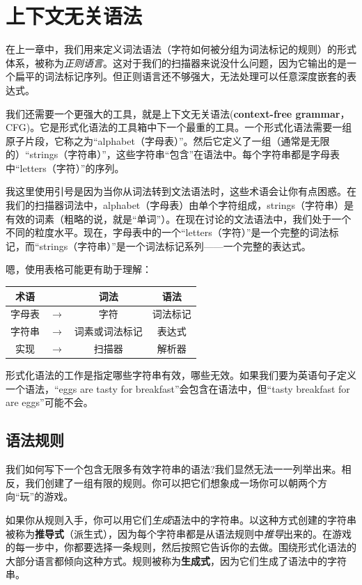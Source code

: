 \documentclass[cn,11pt,chinese]{elegantbook}
\begin{document}
\section{上下文无关语法}

在上一章中，我们用来定义词法语法（字符如何被分组为词法标记的规则）的形式体系，被称为\textit{正则语言}。这对于我们的扫描器来说没什么问题，因为它输出的是一个扁平的词法标记序列。但正则语言还不够强大，无法处理可以任意深度嵌套的表达式。

我们还需要一个更强大的工具，就是上下文无关语法(\textbf{context-free grammar}，CFG)。它是形式化语法的工具箱中下一个最重的工具。一个形式化语法需要一组原子片段，它称之为“alphabet（字母表）”。然后它定义了一组（通常是无限的）“strings（字符串）”，这些字符串“包含”在语法中。每个字符串都是字母表中“letters（字符）”的序列。

我这里使用引号是因为当你从词法转到文法语法时，这些术语会让你有点困惑。在我们的扫描器词法中，alphabet（字母表）由单个字符组成，strings（字符串）是有效的词素（粗略的说，就是“单词”）。在现在讨论的文法语法中，我们处于一个不同的粒度水平。现在，字母表中的一个“letters（字符）”是一个完整的词法标记，而“strings（字符串）”是一个词法标记系列——一个完整的表达式。

嗯，使用表格可能更有助于理解：

\begin{center}
  \begin{tabular}{ |c|c|c|c| } 
   \hline
   术语 &  & 词法 & 语法 \\
   \hline 
   字母表 & $\rightarrow$ & 字符 & 词法标记 \\ 
   字符串 & $\rightarrow$ & 词素或词法标记 & 表达式 \\
   实现 & $\rightarrow$ & 扫描器 & 解析器 \\ 
   \hline
  \end{tabular}
\end{center}

形式化语法的工作是指定哪些字符串有效，哪些无效。如果我们要为英语句子定义一个语法，“eggs are tasty for breakfast”会包含在语法中，但“tasty breakfast for are eggs”可能不会。

\subsection{语法规则}

我们如何写下一个包含无限多有效字符串的语法?我们显然无法一一列举出来。相反，我们创建了一组有限的规则。你可以把它们想象成一场你可以朝两个方向“玩”的游戏。

如果你从规则入手，你可以用它们\textit{生成}语法中的字符串。以这种方式创建的字符串被称为\textbf{推导式}（派生式），因为每个字符串都是从语法规则中\textit{推导}出来的。在游戏的每一步中，你都要选择一条规则，然后按照它告诉你的去做。围绕形式化语法的大部分语言都倾向这种方式。规则被称为\textbf{生成式}，因为它们生成了语法中的字符串。
\end{document}
